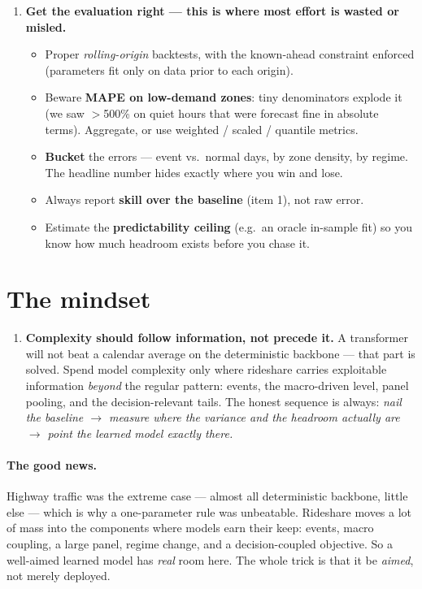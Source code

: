 \documentclass[11pt]{article}
\begin{document}
\begin{enumerate}[leftmargin=*,resume]
\item \textbf{Get the evaluation right --- this is where most effort is wasted or
misled.}
  \begin{itemize}[itemsep=2pt,topsep=2pt]
  \item Proper \emph{rolling-origin} backtests, with the known-ahead constraint
    enforced (parameters fit only on data prior to each origin).
  \item Beware \textbf{MAPE on low-demand zones}: tiny denominators explode it (we
    saw $>$500\% on quiet hours that were forecast fine in absolute terms).
    Aggregate, or use weighted / scaled / quantile metrics.
  \item \textbf{Bucket} the errors --- event vs.\ normal days, by zone density, by
    regime. The headline number hides exactly where you win and lose.
  \item Always report \textbf{skill over the baseline} (item 1), not raw error.
  \item Estimate the \textbf{predictability ceiling} (e.g.\ an oracle in-sample fit)
    so you know how much headroom exists before you chase it.
  \end{itemize}
\end{enumerate}

\section{The mindset}

\begin{enumerate}[leftmargin=*,resume]
\item \textbf{Complexity should follow information, not precede it.} A transformer
will not beat a calendar average on the deterministic backbone --- that part is
solved. Spend model complexity only where rideshare carries exploitable information
\emph{beyond} the regular pattern: events, the macro-driven level, panel pooling,
and the decision-relevant tails. The honest sequence is always: \emph{nail the
baseline $\to$ measure where the variance and the headroom actually are $\to$ point
the learned model exactly there.}
\end{enumerate}

\vspace{0.5em}
\noindent\hrulefill

\paragraph{The good news.} Highway traffic was the extreme case --- almost all
deterministic backbone, little else --- which is why a one-parameter rule was
unbeatable. Rideshare moves a lot of mass into the components where models earn
their keep: events, macro coupling, a large panel, regime change, and a
decision-coupled objective. So a well-aimed learned model has \emph{real} room here.
The whole trick is that it be \emph{aimed}, not merely deployed.
\end{document}
